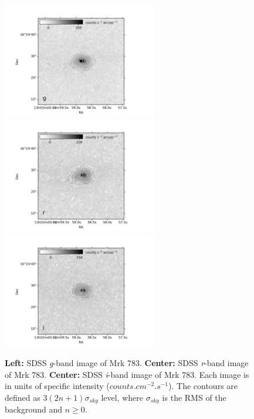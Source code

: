 \documentclass[../thesis.tex]{subfiles}
\begin{document}
\begin{figure}
\centering
\includegraphics[width=0.6\textwidth]{images/paper3/contours_g.jpg} \\
\includegraphics[width=0.6\textwidth]{images/paper3/contours_r.jpg} \\
\includegraphics[width=0.6\textwidth]{images/paper3/contours_i.jpg}
\caption[]{\textbf{Left:} SDSS \emph{g}-band image of Mrk 783. \textbf{Center:} SDSS \emph{r}-band image of Mrk 783. \textbf{Center:} SDSS \emph{i}-band image of Mrk 783. Each image is in units of specific intensity ($\si{counts.cm^{-2}.s^{-1}}$). The contours are defined as $3(2n+1)\sigma_{sky}$ level, where $\sigma_{sky}$ is the RMS of the background and $n\ge 0$. }
\label{fig:contours}
\end{figure}
\end{document}
